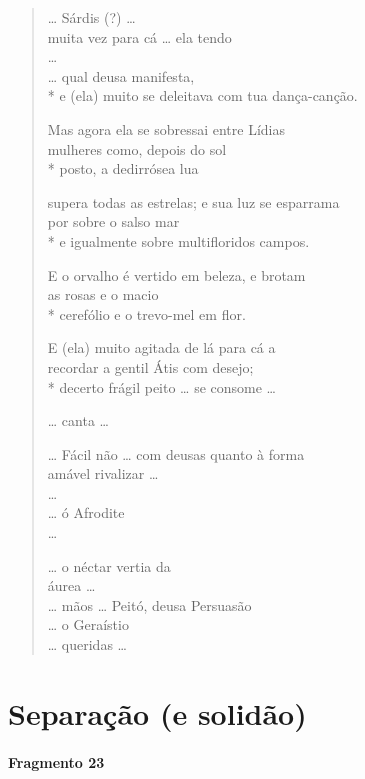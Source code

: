 {\begin{verse}
\ldots{} Sárdis (?) \ldots{}\\
muita vez para cá \ldots{} ela tendo\\
\ldots{}\\
\ldots{} qual deusa manifesta,\\*
e (ela) muito se deleitava com tua dança-canção.

Mas agora ela se sobressai entre Lídias\\
mulheres como, depois do sol\\*
posto, a dedirrósea lua

supera todas as estrelas; e sua luz se esparrama\\
por sobre o salso mar \\*
e igualmente sobre multifloridos campos.

E o orvalho é vertido em beleza, e brotam\\
as rosas e o macio \\*
cerefólio e o trevo-mel em flor.

E (ela) muito agitada de lá para cá a \\
recordar a gentil Átis com desejo;\\*
decerto frágil peito \ldots{} se consome \ldots{}

\ldots{} canta \ldots{}

\ldots{} Fácil não \ldots{} com deusas quanto à forma\\
amável rivalizar \ldots{}\\
\ldots{}\\
\ldots{} ó Afrodite\\
\ldots{}

\ldots{} o néctar vertia da\\
áurea \ldots{}\\
\ldots{} mãos \ldots{} Peitó, deusa Persuasão\\
\ldots{} o Geraístio\\
\ldots{} queridas \ldots{}
\end{verse}


\section{Separação (e solidão)}

\paragraph{Fragmento 23}

}
